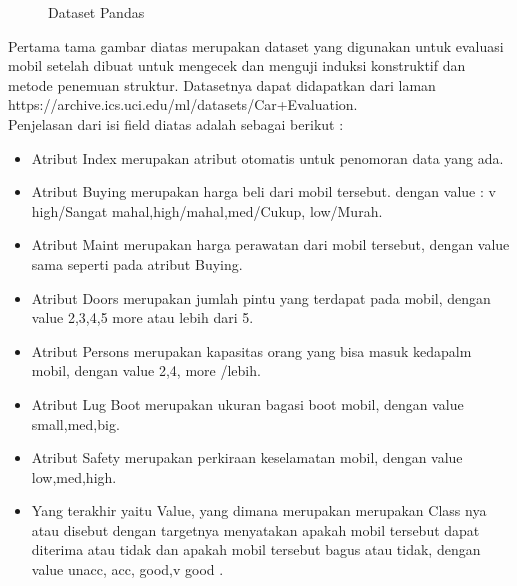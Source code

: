 \begin{enumerate}
\begin{figure}[ht]
\caption{Dataset Pandas}
\label{Contoh}
\end{figure}
\par
Pertama tama gambar diatas merupakan dataset yang digunakan untuk evaluasi mobil setelah dibuat untuk mengecek dan menguji induksi konstruktif dan metode penemuan struktur. Datasetnya dapat didapatkan dari laman https://archive.ics.uci.edu/ml/datasets/Car+Evaluation.\\
Penjelasan dari isi field diatas adalah sebagai berikut :\\
\begin{itemize}
\item
Atribut Index merupakan atribut otomatis untuk penomoran data yang ada.
\item
Atribut Buying merupakan harga beli dari mobil tersebut. dengan value : v high/Sangat mahal,high/mahal,med/Cukup, low/Murah.
\item
Atribut Maint merupakan harga perawatan dari mobil tersebut, dengan value sama seperti pada atribut Buying.
\item
Atribut Doors merupakan jumlah pintu yang terdapat pada mobil, dengan value 2,3,4,5 more atau lebih dari 5.
\item
Atribut Persons merupakan kapasitas orang yang bisa masuk kedapalm mobil, dengan value 2,4, more /lebih.
\item
Atribut Lug Boot merupakan ukuran bagasi boot mobil, dengan value small,med,big.
\item
Atribut Safety merupakan perkiraan keselamatan mobil, dengan value low,med,high.
\item
Yang terakhir yaitu Value, yang dimana merupakan merupakan Class nya atau disebut dengan targetnya menyatakan apakah mobil tersebut dapat diterima atau tidak dan apakah mobil tersebut bagus atau tidak, dengan value unacc, acc, good,v good .
\end{itemize}
\end{enumerate}

